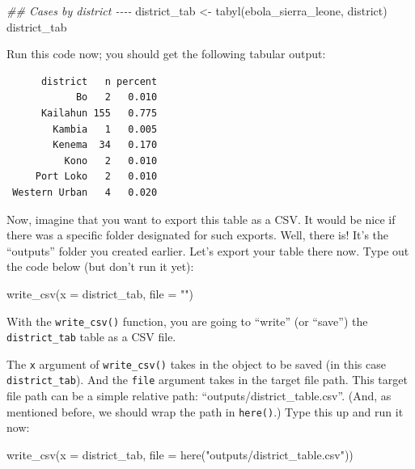 \documentclass[
  letterpaper,
  DIV=11,
  numbers=noendperiod]{scrreprt}
\newenvironment{Shaded}{\begin{snugshade}}{\end{snugshade}}
\newcommand{\AttributeTok}[1]{\textcolor[rgb]{0.40,0.45,0.13}{#1}}
\newcommand{\DocumentationTok}[1]{\textcolor[rgb]{0.37,0.37,0.37}{\textit{#1}}}
\newcommand{\FunctionTok}[1]{\textcolor[rgb]{0.28,0.35,0.67}{#1}}
\newcommand{\NormalTok}[1]{\textcolor[rgb]{0.00,0.23,0.31}{#1}}
\newcommand{\OtherTok}[1]{\textcolor[rgb]{0.00,0.23,0.31}{#1}}
\newcommand{\StringTok}[1]{\textcolor[rgb]{0.13,0.47,0.30}{#1}}
\begin{document}
\begin{Shaded}
\begin{Highlighting}[]
\DocumentationTok{\#\# Cases by district {-}{-}{-}{-}}
\NormalTok{district\_tab }\OtherTok{\textless{}{-}} \FunctionTok{tabyl}\NormalTok{(ebola\_sierra\_leone, district)}
\NormalTok{district\_tab}
\end{Highlighting}
\end{Shaded}

Run this code now; you should get the following tabular output:

\begin{verbatim}
      district   n percent
            Bo   2   0.010
      Kailahun 155   0.775
        Kambia   1   0.005
        Kenema  34   0.170
          Kono   2   0.010
     Port Loko   2   0.010
 Western Urban   4   0.020
\end{verbatim}

Now, imagine that you want to export this table as a CSV. It would be
nice if there was a specific folder designated for such exports. Well,
there is! It's the ``outputs'' folder you created earlier. Let's export
your table there now. Type out the code below (but don't run it yet):

\begin{Shaded}
\begin{Highlighting}[]
\FunctionTok{write\_csv}\NormalTok{(}\AttributeTok{x =}\NormalTok{ district\_tab, }\AttributeTok{file =} \StringTok{""}\NormalTok{)}
\end{Highlighting}
\end{Shaded}

With the \texttt{write\_csv()} function, you are going to ``write'' (or
``save'') the \texttt{district\_tab} table as a CSV file.

The \texttt{x} argument of \texttt{write\_csv()} takes in the object to
be saved (in this case \texttt{district\_tab}). And the \texttt{file}
argument takes in the target file path. This target file path can be a
simple relative path: ``outputs/district\_table.csv''. (And, as
mentioned before, we should wrap the path in \texttt{here()}.) Type this
up and run it now:

\begin{Shaded}
\begin{Highlighting}[]
\FunctionTok{write\_csv}\NormalTok{(}\AttributeTok{x =}\NormalTok{ district\_tab, }\AttributeTok{file =} \FunctionTok{here}\NormalTok{(}\StringTok{"outputs/district\_table.csv"}\NormalTok{))}
\end{Highlighting}
\end{Shaded}
\end{document}
